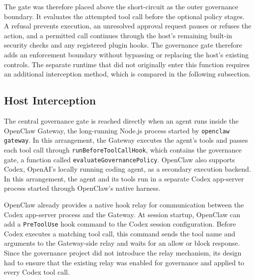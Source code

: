 The gate was therefore placed above the short-circuit as the outer governance
boundary. It evaluates the attempted tool call before the optional policy
stages. A refusal prevents execution, an unresolved approval request pauses or
refuses the action, and a permitted call continues through the host's remaining built-in security
checks and any registered plugin hooks. The governance gate therefore adds an
enforcement boundary without bypassing or replacing the host's existing
controls. The separate runtime that did
not originally enter this function requires an additional interception method,
which is compared in the following subsection.

\subsection{Host Interception}
\label{sec:gov-host-interception}

The central governance gate is reached directly when an agent runs inside the
OpenClaw Gateway, the long-running Node.js process started by
\texttt{openclaw gateway}. In this arrangement, the Gateway executes the
agent's tools and passes each tool call through
\texttt{runBeforeToolCallHook}, which contains the governance gate, a function called \texttt{evaluateGovernancePolicy}. OpenClaw also supports Codex, OpenAI's locally running coding agent, as a
secondary execution backend. In this arrangement, the agent and its tools run
in a separate Codex app-server process started through OpenClaw's native
harness.

OpenClaw already provides a native hook relay for communication between the
Codex app-server process and the Gateway. At session startup, OpenClaw can add a
\texttt{PreToolUse} hook command to the Codex session configuration. Before
Codex executes a matching tool call, this command sends the tool name and
arguments to the Gateway-side relay and waits for an allow or block response.
Since the governance project did not introduce the relay mechanism, its design had to
ensure that the existing relay was enabled for governance and applied to every
Codex tool call.

